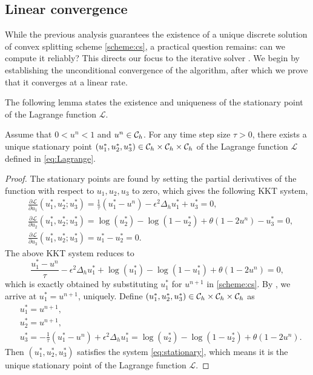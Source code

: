 \subsection{Linear convergence}
While the previous analysis guarantees the existence of a unique discrete solution of convex splitting scheme \eqref{scheme:cs}, 
a practical question remains: can we compute it reliably? 
This directs our focus to the iterative solver . 
We begin by establishing the unconditional convergence of the algorithm, after which we prove that it converges at a linear rate.
\par The following lemma states the existence and uniqueness of the stationary point of the Lagrange function $\mathcal{L}$. 
\begin{lemma}
    Assume that $0<u^n<1$ and $u^n \in {\mathcal{C}_h}$. For any time step size $\tau>0$, there exists a unique stationary point $(u_1^*,u_2^*,u_3^*)\in {\mathcal{C}_h} \times {\mathcal{C}_h} \times {\mathcal{C}_h}$ of the Lagrange function $\mathcal{L}$ defined in \eqref{eq:Lagrange}.
\end{lemma}
\begin{proof}
    The stationary points are found by setting the partial derivatives of the function with respect to $u_1,u_2,u_3$ to zero, 
    which gives the following KKT system,
    \begin{subequations}\label{eq:stationary}
        \begin{align}
        &\frac{\partial \mathcal{L}}{\partial u_1}(u_1^*,u_2^*;u_3^*)
        =\frac{1}{\tau}(u_1^*-u^n)-\epsilon^2\Delta_hu_1^*+u_3^*=0,\\
        &\frac{\partial \mathcal{L}}{\partial u_2}(u_1^*,u_2^*;u_3^*)
        =\log(u_2^*)-\log(1-u_2^*)+\theta(1-2u^n)-u_3^*=0,\\
        &\frac{\partial \mathcal{L}}{\partial u_3}
        (u_1^*,u_2^*;u_3^*)
        =u_1^*-u_2^*=0.
        \end{align}
    \end{subequations}
    The above KKT system reduces to
    \begin{equation}
        \frac{u_1^*-u^n}{\tau}-\epsilon^2\Delta_hu_1^*
    +\log(u_1^*)-\log(1-u_1^*)+\theta(1-2u^n)=0,
    \end{equation}
    which is exactly obtained by substituting $u_1^*$ for $u^{n+1}$ in \eqref{scheme:cs}. By , we arrive at $u_1^*=u^{n+1}$, uniquely. 
    Define $(u_1^*,u_2^*,u_3^*)\in {\mathcal{C}_h} \times {\mathcal{C}_h} \times {\mathcal{C}_h}$ as
    \begin{subequations}
        \begin{align}
            &u_1^*=u^{n+1},\\
            &u_2^*=u^{n+1},\\
            &u_3^*=-\frac{1}{\tau}(u_1^*-u^n)+\epsilon^2\Delta_hu_1^*=\log(u_2^*)-\log(1-u_2^*)+\theta(1-2u^n).
        \end{align}
    \end{subequations}
    Then $(u_1^*,u_2^*,u_3^*)$ satisfies the system \eqref{eq:stationary}, which means it is the unique stationary point of the Lagrange function $\mathcal{L}$.
\end{proof}
